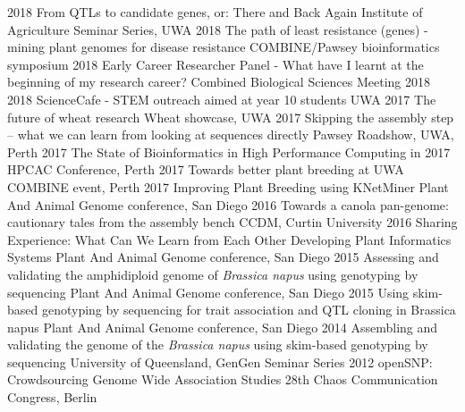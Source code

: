 \documentclass[]{friggeri-cv} %
\begin{document}
\begin{entrylist}
\entry
{2018}
{From QTLs to candidate genes, or: There and Back Again}
{}
{Institute of Agriculture Seminar Series, UWA}
\entry
{2018}
{The path of least resistance (genes) - mining plant genomes for disease resistance}
{}
{COMBINE/Pawsey bioinformatics symposium}
\entry
{2018}
{Early Career Researcher Panel - What have I learnt at the beginning of my research career?}
{}
{Combined Biological Sciences Meeting 2018}
\entry
{2018}
{ScienceCafe - STEM outreach aimed at year 10 students}
{}
{UWA}
\entry
{2017}
{The future of wheat research}
{}
{Wheat showcase, UWA}
\entry
{2017}
{Skipping the assembly step – what we can learn from looking at sequences directly}
{}
{Pawsey Roadshow, UWA, Perth}
\entry
{2017}
{The State of Bioinformatics in High Performance Computing in 2017}
{}
{HPCAC Conference, Perth}
\entry
{2017}
{Towards better plant breeding at UWA}
{}
{COMBINE event, Perth}
\entry
{2017}
{Improving Plant Breeding using KNetMiner}
{}
{Plant And Animal Genome conference, San Diego}
\entry
{2016}
{Towards a canola pan-genome: cautionary tales from the assembly bench}
{}
{CCDM, Curtin University}
\entry
{2016}
{Sharing Experience: What Can We Learn from Each Other Developing Plant Informatics Systems}
{}
{Plant And Animal Genome conference, San Diego}
\entry
{2015}
{Assessing and validating the amphidiploid genome of \textit{Brassica napus} using genotyping by sequencing}
{}
{Plant And Animal Genome conference, San Diego}
\entry
{2015}
{Using skim-based genotyping by sequencing for trait association and QTL cloning in Brassica napus}
{}
{Plant And Animal Genome conference, San Diego}
\entry
{2014}
{Assembling and validating the genome of the \textit{Brassica napus} using skim-based genotyping by sequencing}
{}
{University of Queensland, GenGen Seminar Series}
\entry
{2012}
{openSNP: Crowdsourcing Genome Wide Association Studies}
{}
{28th Chaos Communication Congress, Berlin}
\end{entrylist}
\end{document}
